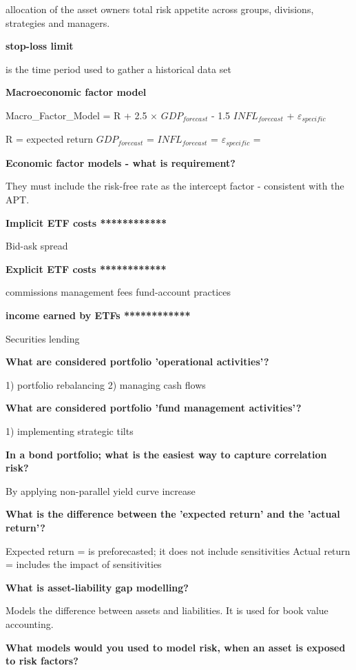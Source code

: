 \documentclass[12pt]{article}
\begin{document}
{allocation of the asset owners total risk appetite across groups, divisions, strategies and managers. 

\textbf{stop-loss limit}


is the time period used to gather a historical data set

\textbf{Macroeconomic factor model}

Macro_Factor_Model = R + 2.5 $\times$ $GDP_{forecast}$ - 1.5 $INFL_{forecast}$ + $\varepsilon_{specific}$

R = expected return
 $GDP_{forecast}$  =
 $INFL_{forecast}$ =
$\varepsilon_{specific}$  =

\textbf{Economic factor models - what is requirement?}

They must include the risk-free rate as the intercept factor - consistent with the APT.

\textbf{Implicit ETF costs ************}

Bid-ask spread

\textbf{Explicit ETF costs ************}

commissions
management fees
fund-account practices

\textbf{income earned by ETFs   ************}

Securities lending

\textbf{What are considered portfolio 'operational activities'?}

1) portfolio rebalancing
2) managing cash flows

\textbf{What are considered portfolio 'fund management activities'?}

1) implementing strategic tilts

\textbf{In a bond portfolio; what is the easiest way to capture correlation risk?}

By applying non-parallel yield curve increase

\textbf{What is the difference between the 'expected return' and the 'actual return'?}

Expected return = is preforecasted; it does not include sensitivities
Actual return = includes the impact of sensitivities

\textbf{What is asset-liability gap modelling?}

Models the difference between assets and liabilities. It is used for book value accounting. 

\textbf{What models would you used to model risk, when an asset is exposed to risk factors?}

}
\end{document}
